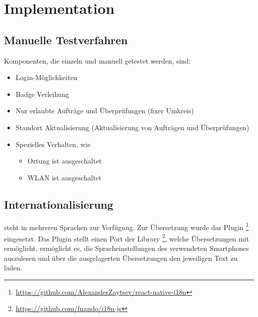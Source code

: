 \chapter{Implementation}
\label{pd-implementation}

\section{Manuelle Testverfahren}
Komponenten, die einzeln und manuell getestet werden, sind:
\begin{itemize}
	\item Login-Möglichkeiten
	\item Badge Verleihung
	\item Nur erlaubte Aufträge und Überprüfungen (fixer Umkreis)
	\item Standort Aktualisierung (Aktualisierung von Aufträgen und Überprüfungen)
	\item Spezielles Verhalten, wie
	\begin{itemize}
		\item Ortung ist ausgeschaltet
		\item WLAN ist ausgeschaltet
	\end{itemize}
\end{itemize}

\section{Internationalisierung}
\kort{} steht in mehreren Sprachen zur Verfügung.
Zur Übersetzung wurde das Plugin \footnote{\url{https://github.com/AlexanderZaytsev/react-native-i18n}} eingesetzt.
Das Plugin stellt einen  Port der Library \footnote{\url{https://github.com/fnando/i18n-js}}, welche Übersetzungen mit  ermöglicht.\newline
{} ermöglicht es, die Spracheinstellungen des verwendeten Smartphones auszulesen und über die ausgelagerten Übersetzungen den jeweiligen Text zu laden.